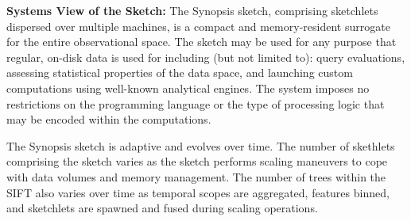 \textbf{Systems View of the Sketch:} The Synopsis sketch, comprising sketchlets dispersed over multiple machines, is a compact and memory-resident surrogate for the entire observational space. The sketch may be used for any purpose that regular, on-disk data is used for including (but not limited to): query evaluations, assessing statistical properties of the data space, and launching custom computations using well-known analytical engines. The system imposes no restrictions on the programming language or the type of processing logic that may be encoded within the computations. 

The Synopsis sketch is adaptive and evolves over time. The number of skethlets comprising the sketch varies as the sketch performs scaling maneuvers to cope with data volumes and memory management. The number of trees within the SIFT  also varies over time as temporal scopes are aggregated, features binned, and sketchlets are spawned and fused during scaling operations.